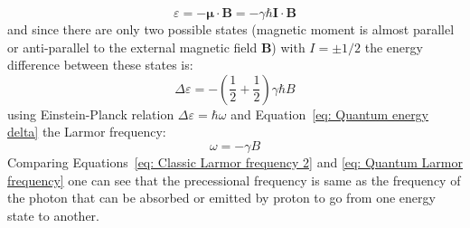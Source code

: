 \begin{equation}\label{eq: Quantum energy}
	\varepsilon=-\boldsymbol{\mu}\cdot \mathbf{B}=-\gamma\hbar\mathbf{I}\cdot\mathbf{B}
\end{equation}
and since there are only two possible states (magnetic moment is almost parallel or anti-parallel to the external magnetic field $\mathbf{B}$) with $ I = \pm 1/2$  the energy difference between these states is:
\begin{equation}\label{eq: Quantum energy delta}
	\Delta\varepsilon=-\left(\frac{1}{2} + \frac{1}{2}\right)\gamma\hbar B
\end{equation}
using Einstein-Planck relation $\Delta\varepsilon=\hbar\omega$ and Equation~\ref{eq: Quantum energy delta} the Larmor frequency:
\begin{equation}\label{eq: Quantum Larmor frequency}
	\omega=-\gamma B
\end{equation} 
Comparing Equations~\ref{eq: Classic Larmor frequency 2} and \ref{eq: Quantum Larmor frequency} one can see that the precessional frequency is same as the frequency of the photon that can be absorbed or emitted by proton to go from one energy state to another.
